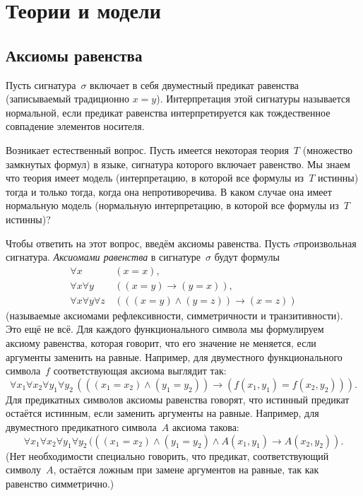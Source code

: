 \chapter{Теории и модели}

\section{Аксиомы равенства}
        \label{equality-axioms}

Пусть сигнатура~$\sigma$ включает в себя двуместный предикат
равенства (записываемый традиционно $x=y$). Интерпретация этой
сигнатуры называется нормальной,%
%
если предикат равенства
интерпретируется как тождественное совпадение элементов
носителя.

Возникает естественный вопрос. Пусть имеется некоторая
теория~$T$ (множество замкнутых формул) в языке, сигнатура
которого включает равенство. Мы знаем что теория имеет модель
(интерпретацию, в которой все формулы из~$T$ истинны) тогда и
только тогда, когда она непротиворечива. В каком случае она
имеет нормальную модель (нормальную интерпретацию, в которой все
формулы из~$T$ истинны)?

Чтобы ответить на этот вопрос, введём аксиомы равенства. Пусть
$\sigma$\т произвольная сигнатура. \emph{Аксиомами равенства}%
%
в сигнатуре~$\sigma$ будут формулы
        \begin{align*}
\forall x&\,(x=x),\\
\forall x\forall y &\,((x=y)\to(y=x)),\\
\forall x\forall y\forall z&\, (((x=y)\land (y=z))\to(x=z))
        \end{align*}
(называемые аксиомами рефлексивности, симметричности и
транзитивности). Это ещё не всё. Для каждого функционального
символа мы формулируем аксиому равенства, которая говорит, что
его значение не меняется, если аргументы заменить на равные.
Например, для двуместного функционального символа~$f$
соответствующая аксиома выглядит так:
       $$
\forall x_1 \forall x_2 \forall y_1 \forall y_2\,
 (((x_1=x_2)\land(y_1=y_2))
\to (f(x_1,y_1)=f(x_2,y_2))).
       $$
Для предикатных символов аксиомы равенства говорят, что
истинный предикат остаётся истинным, если заменить аргументы на
равные. Например, для двуместного предикатного символа~$A$ аксиома
такова:
       $$
\forall x_1 \forall x_2 \forall y_1 \forall y_2\,
 (((x_1=x_2)\land(y_1=y_2)\land A(x_1,y_1)
                    \to A(x_2,y_2)).
       $$
(Нет необходимости специально говорить, что предикат, соответствующий
символу~$A$, остаётся
ложным при замене аргументов на равные, так как равенство
симметрично.)

